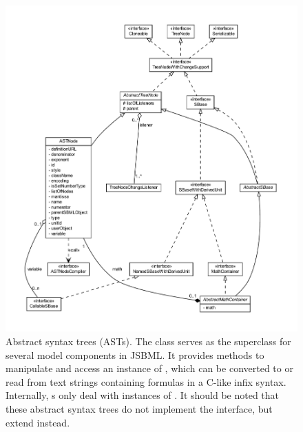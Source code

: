 \begin{figure}[hb]
 \centering
 \includegraphics[width=\textwidth]{../common/img/ASTNode.pdf}
 \caption[Abstract syntax trees]{Abstract syntax trees (ASTs). The class
   \AbstractMathContainer serves as the superclass for several model
   components in JSBML. It provides methods to manipulate and access an
   instance of \ASTNode, which can be converted to or read from text
   strings containing formulas in a C-like infix syntax. Internally,
   \AbstractMathContainer{}s only deal with instances of \ASTNode. It
   should be noted that these abstract syntax trees do not implement the
   \SBase interface, but extend \AbstractTreeNode instead.}
 \label{fig:MathContainer}
\end{figure}

